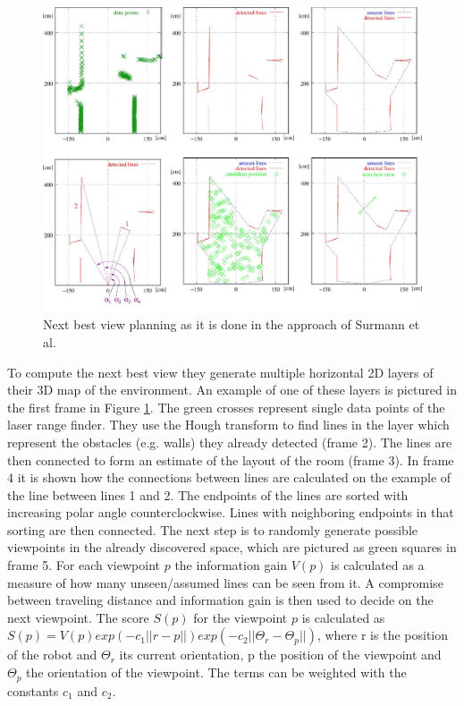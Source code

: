 \documentclass[a4paper,11pt,english]{article}
\begin{document}
\begin{figure}[h!]
	\begin{center}
		\includegraphics[width=1\textwidth]{src/nbv.png}
		\caption{Next best view planning as it is done in the approach of Surmann et al.}
		\label{fig:surmann}
	\end{center}
\end{figure}

To compute the next best view they generate multiple horizontal 2D layers of their 3D map of the environment.
An example of one of these layers is pictured in the first frame in Figure \ref{fig:surmann}.
The green crosses represent single data points of the laser range finder.
They use the Hough transform to find lines in the layer which represent the obstacles (e.g. walls) they already detected (frame 2).
The lines are then connected to form an estimate of the layout of the room (frame 3).
In frame 4 it is shown how the connections between lines are calculated on the example of the line between lines 1 and 2. 
The endpoints of the lines are sorted with increasing polar angle counterclockwise.
Lines with neighboring endpoints in that sorting are then connected.
The next step is to randomly generate possible viewpoints in the already discovered space, which are pictured as green squares in frame 5.
For each viewpoint $p$ the information gain $V(p)$ is calculated as a measure of how many unseen/assumed lines can be seen from it.
A compromise between traveling distance and information gain is then used to decide on the next viewpoint.
The score $S(p)$ for the viewpoint $p$ is calculated as $S(p) = V(p) exp(-c_1||r-p||)exp(-c_2||\Theta_r-\Theta_p||)$, where r is the position of the robot and $\Theta_r$ its current orientation, p the position of the viewpoint and $\Theta_p$ the orientation of the viewpoint. The terms can be weighted with the constants $c_1$ and $c_2$.
\end{document}
